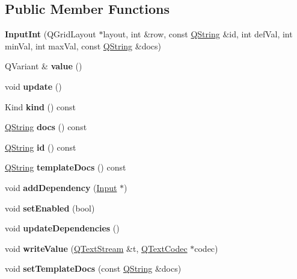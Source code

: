 \subsection*{Public Member Functions}
\begin{DoxyCompactItemize}
\item 
\mbox{\label{class_input_int_a7fc610d2f758d87739ecb8aad47cd39e}} 
{\bfseries Input\+Int} (Q\+Grid\+Layout $\ast$layout, int \&row, const \mbox{\hyperlink{class_q_string}{Q\+String}} \&id, int def\+Val, int min\+Val, int max\+Val, const \mbox{\hyperlink{class_q_string}{Q\+String}} \&docs)
\item 
\mbox{\label{class_input_int_a7fe2f461003ff32c996a2aeb9ee07384}} 
Q\+Variant \& {\bfseries value} ()
\item 
\mbox{\label{class_input_int_a9e800d343da95c2df7fb768e20c9a112}} 
void {\bfseries update} ()
\item 
\mbox{\label{class_input_int_a10f6e9fbe9900252534473627c1cea60}} 
Kind {\bfseries kind} () const
\item 
\mbox{\label{class_input_int_a9bc5e91dd356161f91418bcadcee81e7}} 
\mbox{\hyperlink{class_q_string}{Q\+String}} {\bfseries docs} () const
\item 
\mbox{\label{class_input_int_a2c00c0a212d0ea64eb5c5413b4d2b550}} 
\mbox{\hyperlink{class_q_string}{Q\+String}} {\bfseries id} () const
\item 
\mbox{\label{class_input_int_a9b8b4c78b51674ee98a84138c87524d2}} 
\mbox{\hyperlink{class_q_string}{Q\+String}} {\bfseries template\+Docs} () const
\item 
\mbox{\label{class_input_int_af87701d09b1c6c53122857cf06f3ac9f}} 
void {\bfseries add\+Dependency} (\mbox{\hyperlink{class_input}{Input}} $\ast$)
\item 
\mbox{\label{class_input_int_a0ac54eacde8aaf5b63b61f3ad1552cca}} 
void {\bfseries set\+Enabled} (bool)
\item 
\mbox{\label{class_input_int_a74643e6c6b576950df380fb21a7de54a}} 
void {\bfseries update\+Dependencies} ()
\item 
\mbox{\label{class_input_int_a2920733e59e4716c8fd0e5e9adf67ba1}} 
void {\bfseries write\+Value} (\mbox{\hyperlink{class_q_text_stream}{Q\+Text\+Stream}} \&t, \mbox{\hyperlink{class_q_text_codec}{Q\+Text\+Codec}} $\ast$codec)
\item 
\mbox{\label{class_input_int_ad4f9a0ed2073110852122054cc03c774}} 
void {\bfseries set\+Template\+Docs} (const \mbox{\hyperlink{class_q_string}{Q\+String}} \&docs)
\end{DoxyCompactItemize}
